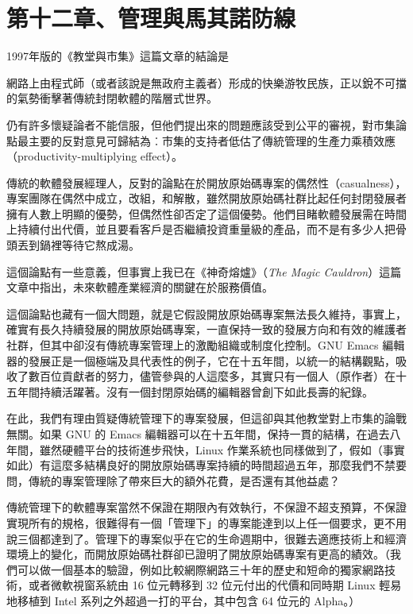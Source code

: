 \documentclass[12pt,]{article}
\makeatletter
\newcommand*{\shifttext}[2]{%
  \settowidth{\@tempdima}{#2}%
  \makebox[\@tempdima]{\hspace*{#1}#2}%
}
\makeatother
\begin{document}
\newpage
\section{第十二章、管理與馬其諾防線}

1997年版的《教堂與市集》這篇文章的結論是 \shifttext{1pt}{---}\shifttext{-1pt}{---}
網路上由程式師（或者該說是無政府主義者）形成的快樂游牧民族，正以銳不可擋的氣勢衝擊著傳統封閉軟體的階層式世界。

仍有許多懷疑論者不能信服，但他們提出來的問題應該受到公平的審視，對市集論點最主要的反對意見可歸結為︰市集的支持者低估了傳統管理的生產力乘積效應（productivity-multiplying
effect）。

傳統的軟體發展經理人，反對的論點在於開放原始碼專案的偶然性（casualness），專案團隊在偶然中成立，改組，和解散，雖然開放原始碼社群比起任何封閉發展者擁有人數上明顯的優勢，但偶然性卻否定了這個優勢。他們目睹軟體發展需在時間上持續付出代價，並且要看客戶是否繼續投資重量級的產品，而不是有多少人把骨頭丟到鍋裡等待它熬成湯。

這個論點有一些意義，但事實上我已在《神奇熔爐》（\emph{The Magic
Cauldron}）這篇文章中指出，未來軟體產業經濟的關鍵在於服務價值。

這個論點也藏有一個大問題，就是它假設開放原始碼專案無法長久維持，事實上，確實有長久持續發展的開放原始碼專案，一直保持一致的發展方向和有效的維護者社群，但其中卻沒有傳統專案管理上的激勵組織或制度化控制。GNU
Emacs
編輯器的發展正是一個極端及具代表性的例子，它在十五年間，以統一的結構觀點，吸收了數百位貢獻者的努力，儘管參與的人這麼多，其實只有一個人（原作者）在十五年間持續活躍著。沒有一個封閉原始碼的編輯器曾創下如此長壽的紀錄。

在此，我們有理由質疑傳統管理下的專案發展，但這卻與其他教堂對上市集的論戰無關。如果
GNU 的 Emacs
編輯器可以在十五年間，保持一貫的結構，在過去八年間，雖然硬體平台的技術進步飛快，Linux
作業系統也同樣做到了，假如（事實如此）有這麼多結構良好的開放原始碼專案持續的時間超過五年，那麼我們不禁要問，傳統的專案管理除了帶來巨大的額外花費，是否還有其他益處？

傳統管理下的軟體專案當然不保證在期限內有效執行，不保證不超支預算，不保證實現所有的規格，很難得有一個「管理下」的專案能達到以上任一個要求，更不用說三個都達到了。管理下的專案似乎在它的生命週期中，很難去適應技術上和經濟環境上的變化，而開放原始碼社群卻已證明了開放原始碼專案有更高的績效。（我們可以做一個基本的驗證，例如比較網際網路三十年的歷史和短命的獨家網路技術，或者微軟視窗系統由
16 位元轉移到 32 位元付出的代價和同時期 Linux 輕易地移植到 Intel
系列之外超過一打的平台，其中包含 64 位元的 Alpha。）
\end{document}
